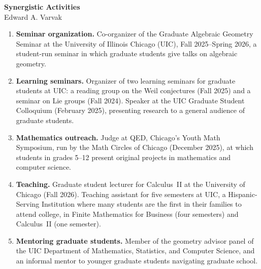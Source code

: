 \documentclass[11pt]{article}
\begin{document}
\begin{center}
  {\Large\bfseries Synergistic Activities}\\[5pt]
  Edward A. Varvak
\end{center}

\begin{enumerate}[label=\arabic*., itemsep=0.5\baselineskip]

\item \textbf{Seminar organization.} Co-organizer of the Graduate Algebraic Geometry Seminar
at the University of Illinois Chicago (UIC), Fall 2025--Spring 2026, a student-run seminar in
which graduate students give talks on algebraic geometry.

\item \textbf{Learning seminars.} Organizer of two learning seminars for graduate students at
UIC: a reading group on the Weil conjectures (Fall 2025) and a seminar on Lie groups (Fall
2024). Speaker at the UIC Graduate Student Colloquium (February 2025), presenting research
to a general audience of graduate students.

\item \textbf{Mathematics outreach.} Judge at QED, Chicago's Youth Math Symposium, run by the
Math Circles of Chicago (December 2025), at which students in grades 5--12 present original
projects in mathematics and computer science.

\item \textbf{Teaching.} Graduate student lecturer for Calculus~II at the University of
Chicago (Fall 2026). Teaching assistant for five semesters at UIC, a Hispanic-Serving
Institution where many students are the first in their families to attend college, in
Finite Mathematics for Business (four semesters) and Calculus~II (one semester).

\item \textbf{Mentoring graduate students.} Member of the geometry advisor panel of the UIC
Department of Mathematics, Statistics, and Computer Science, and an informal mentor to
younger graduate students navigating graduate school.

\end{enumerate}
\end{document}
